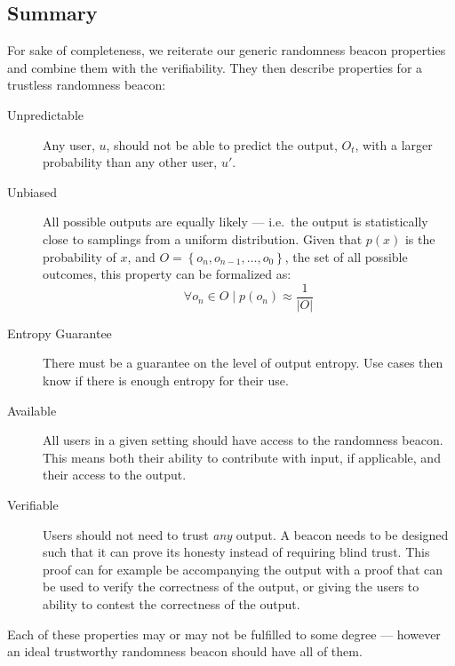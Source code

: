 \subsection{Summary}

For sake of completeness, we reiterate our generic randomness beacon properties and combine them with the verifiability.
They then describe properties for a trustless randomness beacon:

\begin{description}
    \item[Unpredictable]
        Any user, $u$, should not be able to predict the output, $O_t$, with a larger probability than any other user, $u'$.
    \item[Unbiased]
        All possible outputs are equally likely --- i.e.\ the output is statistically close to samplings from a uniform distribution.
        Given that $p(x)$ is the probability of $x$, and $O = \left\{ {o_n, o_{n-1}, \ldots, o_{0}} \right\}$, the set of all possible outcomes, this property can be formalized as:
        $$ \forall o_n \in O \mid p(o_n) \approx \frac{1}{\left\vert{O}\right\vert}$$
    \item[Entropy Guarantee]
        There must be a guarantee on the level of output entropy.
        Use cases then know if there is enough entropy for their use.
    \item[Available]
        All users in a given setting should have access to the randomness beacon.
        This means both their ability to contribute with input, if applicable, and their access to the output.
    \item[Verifiable]
        Users should not need to trust \emph{any} output.
        A beacon needs to be designed such that it can prove its honesty instead of requiring blind trust.
        This proof can for example be accompanying the output with a proof that can be used to verify the correctness of the output, or giving the users to ability to contest the correctness of the output.
\end{description}

Each of these properties may or may not be fulfilled to some degree --- however an ideal trustworthy randomness beacon should have all of them.

